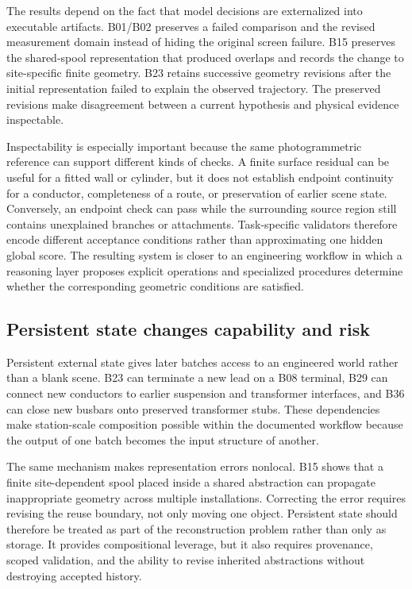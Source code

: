 \documentclass[10pt,a4paper]{article}
\begin{document}
The results depend on the fact that model decisions are externalized
into executable artifacts. B01/B02 preserves a failed comparison and the
revised measurement domain instead of hiding the original screen
failure. B15 preserves the shared-spool representation that produced
overlaps and records the change to site-specific finite geometry. B23
retains successive geometry revisions after the initial representation
failed to explain the observed trajectory. The preserved revisions make
disagreement between a current hypothesis and physical evidence
inspectable.

Inspectability is especially important because the same photogrammetric
reference can support different kinds of checks. A finite surface
residual can be useful for a fitted wall or cylinder, but it does not
establish endpoint continuity for a conductor, completeness of a route,
or preservation of earlier scene state. Conversely, an endpoint check
can pass while the surrounding source region still contains unexplained
branches or attachments. Task-specific validators therefore encode
different acceptance conditions rather than approximating one hidden
global score. The resulting system is closer to an engineering workflow
in which a reasoning layer proposes explicit operations and specialized
procedures determine whether the corresponding geometric conditions are
satisfied.

\hypertarget{persistent-state-changes-capability-and-risk}{%
\subsection{Persistent state changes capability and
risk}\label{persistent-state-changes-capability-and-risk}}

Persistent external state gives later batches access to an engineered
world rather than a blank scene. B23 can terminate a new lead on a B08
terminal, B29 can connect new conductors to earlier suspension and
transformer interfaces, and B36 can close new busbars onto preserved
transformer stubs. These dependencies make station-scale composition
possible within the documented workflow because the output of one batch
becomes the input structure of another.

The same mechanism makes representation errors nonlocal. B15 shows that
a finite site-dependent spool placed inside a shared abstraction can
propagate inappropriate geometry across multiple installations.
Correcting the error requires revising the reuse boundary, not only
moving one object. Persistent state should therefore be treated as part
of the reconstruction problem rather than only as storage. It provides
compositional leverage, but it also requires provenance, scoped
validation, and the ability to revise inherited abstractions without
destroying accepted history.
\end{document}
